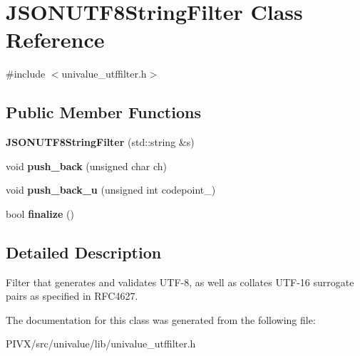 \hypertarget{class_j_s_o_n_u_t_f8_string_filter}{}\section{J\+S\+O\+N\+U\+T\+F8\+String\+Filter Class Reference}
\label{class_j_s_o_n_u_t_f8_string_filter}


{\ttfamily \#include $<$univalue\+\_\+utffilter.\+h$>$}

\subsection*{Public Member Functions}
\begin{DoxyCompactItemize}
\item 
\mbox{\label{class_j_s_o_n_u_t_f8_string_filter_af04e0606d399b8e2d1ce3c512b81b154}} 
{\bfseries J\+S\+O\+N\+U\+T\+F8\+String\+Filter} (std\+::string \&s)
\item 
\mbox{\label{class_j_s_o_n_u_t_f8_string_filter_a714fa066c623119f18728242ec855eb5}} 
void {\bfseries push\+\_\+back} (unsigned char ch)
\item 
\mbox{\label{class_j_s_o_n_u_t_f8_string_filter_aaf334e7b4789400644ef65f70f72484e}} 
void {\bfseries push\+\_\+back\+\_\+u} (unsigned int codepoint\+\_\+)
\item 
\mbox{\label{class_j_s_o_n_u_t_f8_string_filter_a83905d8112c98598ca3345cfa0c6e052}} 
bool {\bfseries finalize} ()
\end{DoxyCompactItemize}


\subsection{Detailed Description}
Filter that generates and validates U\+T\+F-\/8, as well as collates U\+T\+F-\/16 surrogate pairs as specified in R\+F\+C4627. 

The documentation for this class was generated from the following file\+:\begin{DoxyCompactItemize}
\item 
P\+I\+V\+X/src/univalue/lib/univalue\+\_\+utffilter.\+h\end{DoxyCompactItemize}
